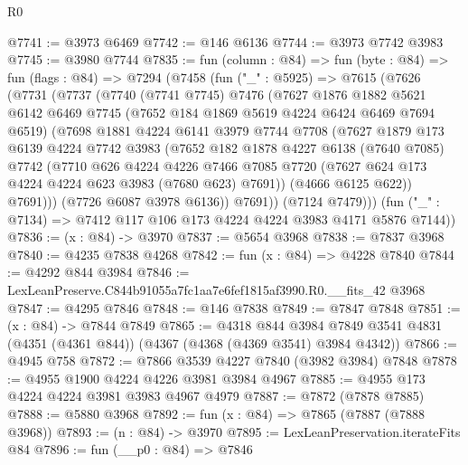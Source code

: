 \begin{lexlean}{R0}
\begin{coremodule}
@7741 := @3973 @6469
@7742 := @146 @6136
@7744 := @3973 @7742 @3983
@7745 := @3980 @7744
@7835 := fun (column : @84) =>
  fun (byte : @84) =>
  fun (flags : @84) =>
  @7294
    (@7458
      (fun ("_" : @5925) =>
      @7615
        (@7626
          (@7731
            (@7737
              (@7740
                (@7741 @7745)
                @7476
                (@7627
                  @1876
                  @1882
                  @5621
                  @6142
                  @6469
                  @7745
                  (@7652 @184 @1869 @5619 @4224 @6424 @6469 @7694 @6519)
                  (@7698
                    @1881
                    @4224
                    @6141
                    @3979
                    @7744
                    @7708
                    (@7627
                      @1879
                      @173
                      @6139
                      @4224
                      @7742
                      @3983
                      (@7652
                        @182
                        @1878
                        @4227
                        @6138
                        (@7640 @7085)
                        @7742
                        (@7710
                          @626
                          @4224
                          @4226
                          @7466
                          @7085
                          @7720
                          (@7627 @624 @173 @4224 @4224 @623 @3983 (@7680 @623) @7691))
                        (@4666 @6125 @622))
                      @7691)))
                (@7726 @6087 @3978 @6136))
              @7691))
          (@7124 @7479)))
      (fun ("_" : @7134) => @7412 @117 @106 @173 @4224 @4224 @3983 @4171 @5876 @7144))
@7836 := (x : @84) -> @3970
@7837 := @5654 @3968
@7838 := @7837 @3968
@7840 := @4235 @7838 @4268
@7842 := fun (x : @84) => @4228 @7840
@7844 := @4292 @844 @3984
@7846 := LexLeanPreserve.C844b91055a7fc1aa7e6fef1815af3990.R0.__fits_42 @3968
@7847 := @4295 @7846
@7848 := @146 @7838
@7849 := @7847 @7848
@7851 := (x : @84) -> @7844 @7849
@7865 := @4318
    @844
    @3984
    @7849
    @3541
    @4831
    (@4351 (@4361 @844))
    (@4367 (@4368 (@4369 @3541) @3984 @4342))
@7866 := @4945 @758
@7872 := @7866 @3539 @4227 @7840 (@3982 @3984) @7848
@7878 := @4955 @1900 @4224 @4226 @3981 @3984 @4967
@7885 := @4955 @173 @4224 @4224 @3981 @3983 @4967 @4979
@7887 := @7872 (@7878 @7885)
@7888 := @5880 @3968
@7892 := fun (x : @84) => @7865 (@7887 (@7888 @3968))
@7893 := (n : @84) -> @3970
@7895 := LexLeanPreservation.iterateFits @84
@7896 := fun (__p0 : @84) => @7846

\end{coremodule}
\end{lexlean}
